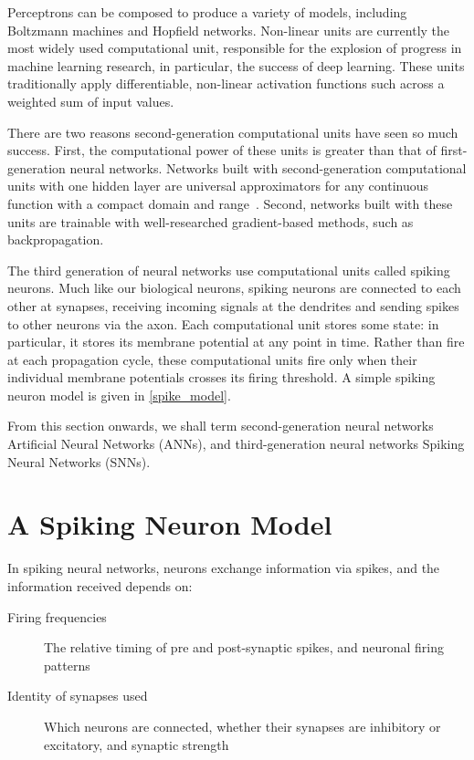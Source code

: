 \documentclass[fyp]{socreport}
\begin{document}
Perceptrons can be composed to produce a variety of models, including Boltzmann
machines and Hopfield networks. Non-linear units are currently the most widely
used computational unit, responsible for the explosion of progress in machine
learning research, in particular, the success of deep learning. These units
traditionally apply differentiable, non-linear activation functions such across
a weighted sum of input values.

There are two reasons second-generation computational units have seen so much
success. First, the computational power of these units is greater than that of
first-generation neural networks. Networks built with second-generation
computational units with one hidden layer are universal approximators for any
continuous function with a compact domain and range~\cite{Cybenko1989}. Second,
networks built with these units are trainable with well-researched
gradient-based methods, such as backpropagation.

The third generation of neural networks use computational units called spiking
neurons. Much like our biological neurons, spiking neurons are connected to each
other at synapses, receiving incoming signals at the dendrites and sending
spikes to other neurons via the axon. Each computational unit stores some state:
in particular, it stores its membrane potential at any point in time. Rather
than fire at each propagation cycle, these computational units fire only when
their individual membrane potentials crosses its firing threshold. A simple
spiking neuron model is given in \autoref{spike_model}.

From this section onwards, we shall term second-generation neural networks
Artificial Neural Networks (ANNs), and third-generation neural networks Spiking
Neural Networks (SNNs).

\section{A Spiking Neuron Model\label{sec:spiking-neuron-model}}

In spiking neural networks, neurons exchange information via spikes, and the
information received depends on:

\begin{description}
\item[{Firing frequencies}] The relative timing of pre and post-synaptic spikes,
and neuronal firing patterns
\item[{Identity of synapses used}] Which neurons are connected, whether their
synapses are inhibitory or excitatory, and synaptic strength
\end{description}
\end{document}
